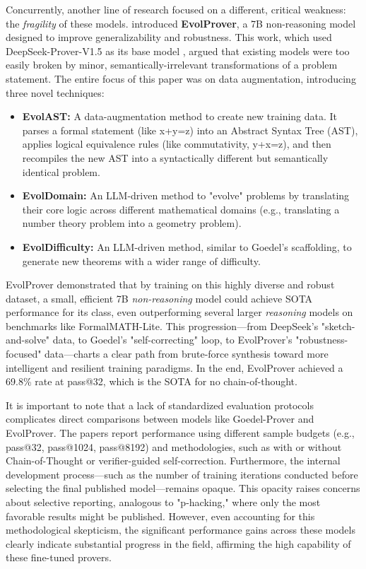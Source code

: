 \documentclass[12pt, letterpaper]{article}
\begin{document}
Concurrently, another line of research focused on a different, critical weakness: the \textit{fragility} of these models. \citet{tian2025evolproveradvancingautomatedtheorem} introduced \textbf{EvolProver}, a 7B non-reasoning model designed to improve generalizability and robustness. This work, which used DeepSeek-Prover-V1.5 as its base model , argued that existing models were too easily broken by minor, semantically-irrelevant transformations of a problem statement. The entire focus of this paper was on data augmentation, introducing three novel techniques: \begin{itemize} \item \textbf{EvolAST:} A data-augmentation method to create new training data. It parses a formal statement (like x+y=z) into an Abstract Syntax Tree (AST), applies logical equivalence rules (like commutativity, y+x=z), and then recompiles the new AST into a syntactically different but semantically identical problem. \item \textbf{EvolDomain:} An LLM-driven method to "evolve" problems by translating their core logic across different mathematical domains (e.g., translating a number theory problem into a geometry problem). \item \textbf{EvolDifficulty:} An LLM-driven method, similar to Goedel's scaffolding, to generate new theorems with a wider range of difficulty. \end{itemize} EvolProver demonstrated that by training on this highly diverse and robust dataset, a small, efficient 7B \textit{non-reasoning} model could achieve SOTA performance for its class, even outperforming several larger \textit{reasoning} models on benchmarks like FormalMATH-Lite. This progression—from DeepSeek's "sketch-and-solve" data, to Goedel's "self-correcting" loop, to EvolProver's "robustness-focused" data—charts a clear path from brute-force synthesis toward more intelligent and resilient training paradigms. In the end, EvolProver achieved a 69.8\% rate at pass@32, which is the SOTA for no chain-of-thought. 

It is important to note that a lack of standardized evaluation protocols complicates direct comparisons between models like Goedel-Prover and EvolProver. The papers report performance using different sample budgets (e.g., pass@32, pass@1024, pass@8192) and methodologies, such as with or without Chain-of-Thought or verifier-guided self-correction. Furthermore, the internal development process—such as the number of training iterations conducted before selecting the final published model—remains opaque. This opacity raises concerns about selective reporting, analogous to "p-hacking," where only the most favorable results might be published. However, even accounting for this methodological skepticism, the significant performance gains across these models clearly indicate substantial progress in the field, affirming the high capability of these fine-tuned provers.
\end{document}
